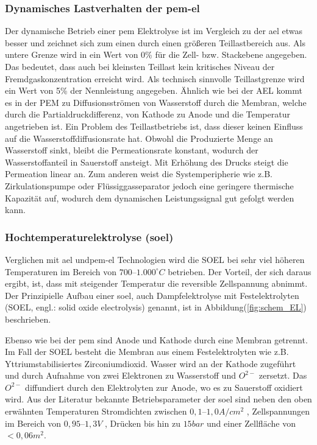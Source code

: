 \documentclass[onecolumn,10pt,titlepage]{article}
\begin{document}
			\subsubsection*{Dynamisches Lastverhalten der \gls{pem}-\gls{el}}
			Der dynamische Betrieb einer \gls{pem} Elektrolyse ist im Vergleich zu der \gls{ael} etwas besser und zeichnet sich zum einen durch einen größeren Teillastbereich aus. Als untere Grenze wird in \cite{Smolinka.05.07.2011} ein Wert von 0\% für die Zell- bzw. Stackebene angegeben. Das bedeutet, dass auch bei kleinsten Teillast kein kritisches Niveau der Fremdgaskonzentration erreicht wird. Als technisch sinnvolle Teillastgrenze wird ein Wert von 5\% der Nennleistung angegeben. Ähnlich wie bei der AEL kommt es in der PEM zu Diffusionsströmen von Wasserstoff durch die Membran, welche durch die Partialdruckdifferenz, von Kathode zu Anode und die Temperatur angetrieben ist. Ein Problem des Teillastbetriebs ist, dass dieser keinen Einfluss auf die Wasserstoffdiffusionsrate hat. Obwohl die Produzierte Menge an Wasserstoff sinkt, bleibt die Permeationsrate konstant, wodurch der Wasserstoffanteil in Sauerstoff ansteigt. Mit Erhöhung des Drucks steigt die Permeation linear an.
			Zum anderen weist die Systemperipherie wie z.B. Zirkulationspumpe oder Flüssiggasseparator jedoch eine geringere thermische Kapazität auf, wodurch dem dynamischen Leistungssignal gut gefolgt werden kann.

			\subsubsection*{Hochtemperaturelektrolyse (\gls{soel})}
			Verglichen mit \gls{ael} und\gls{pem}-\gls{el} Technologien wird die SOEL bei sehr viel höheren Temperaturen im Bereich von $700–1.000 ^\circ C$ \cite{Zhang.2010} betrieben. Der Vorteil, der sich daraus ergibt, ist, dass mit steigender Temperatur die reversible Zellspannung abnimmt. Der Prinzipielle Aufbau einer \gls{soel}, auch Dampfelektrolyse mit Festelektrolyten (SOEL, engl.: solid oxide electrolysis) genannt, ist in Abbildung(\ref{fig:schem_EL}) beschrieben.

			Ebenso wie bei der \gls{pem} sind Anode und Kathode durch eine Membran getrennt. Im Fall der SOEL besteht die Membran aus einem Festelektrolyten wie z.B. Yttriumstabilisiertes Zirconiumdioxid.\cite{Ghaib.2017} Wasser wird an der Kathode zugeführt und durch Aufnahme von zwei Elektronen zu Wasserstoff und $O^{2-}$ zersetzt. Das $O^{2-}$ diffundiert durch den Elektrolyten zur Anode, wo es zu Sauerstoff oxidiert wird.
			Aus der Literatur bekannte Betriebsparameter der \gls{soel} sind neben den oben erwähnten Temperaturen Stromdichten zwischen $0,1–1,0 A/cm^2$ \cite{Buttler.2018}, Zellspannungen im Bereich von $0,95–1,3 V$ \cite{Ghaib.2017} , Drücken bis hin zu $15 bar$ \cite{Buttler.2018} und einer Zellfläche von $<0,06 m^2$.
\end{document}
